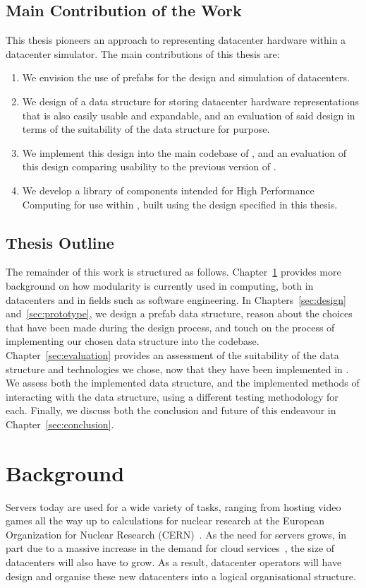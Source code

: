 \documentclass[11pt]{article}
\begin{document}
	\subsection{Main Contribution of the Work}
		This thesis pioneers an approach to representing datacenter hardware within a datacenter simulator.
		The main contributions of this thesis are:
		\begin{enumerate}
			\item We envision the use of prefabs for the design and simulation of datacenters.
			\item We design of a data structure for storing datacenter hardware representations that is also easily usable and expandable, and an evaluation of said design in terms of the suitability of the data structure for purpose.
			\item We implement this design into the main codebase of \opendc{}, and an evaluation of this design comparing usability to the previous version of \opendc{}.
			\item We develop a library of components intended for High Performance Computing for use within \opendc{}, built using the design specified in this thesis.
		\end{enumerate}
	
	\subsection{Thesis Outline}
		The remainder of this work is structured as follows.
		Chapter~\ref{sec:background} provides more background on how modularity is currently used in computing, both in datacenters and in fields such as software engineering. 
		In Chapters~\ref{sec:design} and~\ref{sec:prototype}, we design a prefab data structure, reason about the choices that have been made during the design process, and touch on the process of implementing our chosen data structure into the \opendc{} codebase.
		Chapter~\ref{sec:evaluation} provides an assessment of the suitability of the data structure and technologies we chose, now that they have been implemented in \opendc{}.
		We assess both the implemented data structure, and the implemented methods of interacting with the data structure, using a different testing methodology for each.
		Finally, we discuss both the conclusion and future of this endeavour in Chapter~\ref{sec:conclusion}.
	

	

\newpage

\section{Background} \label{sec:background}
	Servers today are used for a wide variety of tasks, ranging from hosting video games all the way up to calculations for nuclear research at the European Organization for Nuclear Research (CERN)~\cite{Andrade2012}.
	As the need for servers grows, in part due to a massive increase in the demand for cloud services~\cite{Pring2009}, the size of datacenters will also have to grow.
	As a result, datacenter operators will have design and organise these new datacenters into a logical organisational structure.
\end{document}
